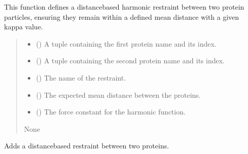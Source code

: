 \documentclass[letterpaper,10pt,english]{sphinxmanual}
\begin{document}
\begin{fulllineitems}
\begin{fulllineitems}
\sphinxAtStartPar
This function defines a distance\sphinxhyphen{}based harmonic restraint between
two protein particles, ensuring they remain within a defined mean
distance with a given kappa value.
\begin{quote}\begin{description}
\begin{itemize}
\item {} 
\sphinxAtStartPar
{} () \textendash{} A tuple containing the first protein name and its index.

\item {} 
\sphinxAtStartPar
{} () \textendash{} A tuple containing the second protein name and its index.

\item {} 
\sphinxAtStartPar
{} () \textendash{} The name of the restraint.

\item {} 
\sphinxAtStartPar
{} () \textendash{} The expected mean distance between the proteins.

\item {} 
\sphinxAtStartPar
{} () \textendash{} The force constant for the harmonic function.

\end{itemize}

\sphinxAtStartPar
None

\end{description}\end{quote}

\end{fulllineitems}


\begin{fulllineitems}
\label{\detokenize{src:src.Interaction_Class.Interaction.add_distance_restraint}}
\pysigstartsignatures
{}
\pysigstopsignatures
\sphinxAtStartPar
Adds a distance\sphinxhyphen{}based restraint between two proteins.


\end{fulllineitems}
\end{fulllineitems}
\end{document}
